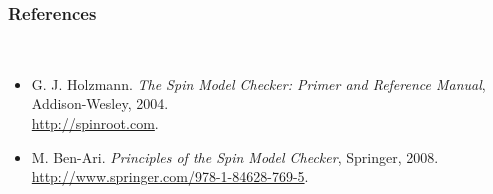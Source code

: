 \documentclass{leaflet}
\newcommand{\sct}[1]{\subsubsection{#1}\mbox{}\\}
\begin{document}
\sct{References}
\vspace*{-2ex}
\begin{itemize}
\item G. J. Holzmann. \textit{The Spin Model Checker: Primer and Reference Manual},
Addison-Wesley, 2004.\\\url{http://spinroot.com}.
\item M. Ben-Ari. \textit{Principles of the Spin Model Checker},
Springer, 2008.\\\url{http://www.springer.com/978-1-84628-769-5}.
\end{itemize}
\end{document}
